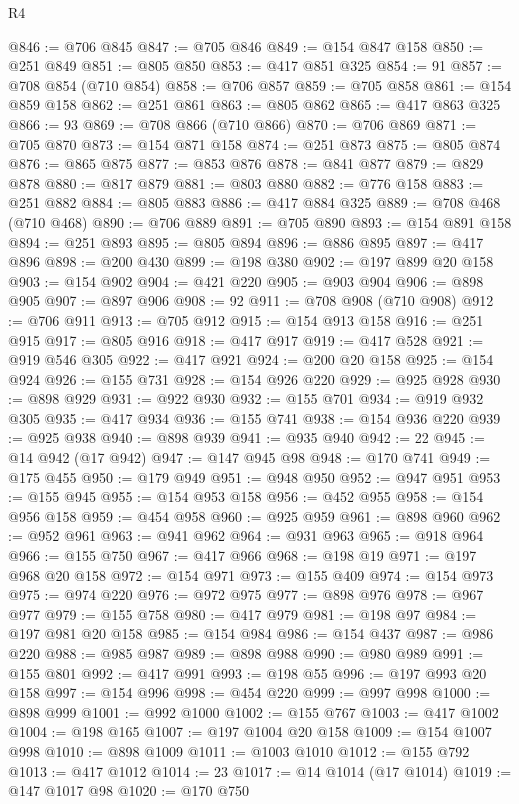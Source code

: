 \begin{lexlean}{R4}
\begin{coremodule}
@846 := @706 @845
@847 := @705 @846
@849 := @154 @847 @158
@850 := @251 @849
@851 := @805 @850
@853 := @417 @851 @325
@854 := 91
@857 := @708 @854 (@710 @854)
@858 := @706 @857
@859 := @705 @858
@861 := @154 @859 @158
@862 := @251 @861
@863 := @805 @862
@865 := @417 @863 @325
@866 := 93
@869 := @708 @866 (@710 @866)
@870 := @706 @869
@871 := @705 @870
@873 := @154 @871 @158
@874 := @251 @873
@875 := @805 @874
@876 := @865 @875
@877 := @853 @876
@878 := @841 @877
@879 := @829 @878
@880 := @817 @879
@881 := @803 @880
@882 := @776 @158
@883 := @251 @882
@884 := @805 @883
@886 := @417 @884 @325
@889 := @708 @468 (@710 @468)
@890 := @706 @889
@891 := @705 @890
@893 := @154 @891 @158
@894 := @251 @893
@895 := @805 @894
@896 := @886 @895
@897 := @417 @896
@898 := @200 @430
@899 := @198 @380
@902 := @197 @899 @20 @158
@903 := @154 @902
@904 := @421 @220
@905 := @903 @904
@906 := @898 @905
@907 := @897 @906
@908 := 92
@911 := @708 @908 (@710 @908)
@912 := @706 @911
@913 := @705 @912
@915 := @154 @913 @158
@916 := @251 @915
@917 := @805 @916
@918 := @417 @917
@919 := @417 @528
@921 := @919 @546 @305
@922 := @417 @921
@924 := @200 @20 @158
@925 := @154 @924
@926 := @155 @731
@928 := @154 @926 @220
@929 := @925 @928
@930 := @898 @929
@931 := @922 @930
@932 := @155 @701
@934 := @919 @932 @305
@935 := @417 @934
@936 := @155 @741
@938 := @154 @936 @220
@939 := @925 @938
@940 := @898 @939
@941 := @935 @940
@942 := 22
@945 := @14 @942 (@17 @942)
@947 := @147 @945 @98
@948 := @170 @741
@949 := @175 @455
@950 := @179 @949
@951 := @948 @950
@952 := @947 @951
@953 := @155 @945
@955 := @154 @953 @158
@956 := @452 @955
@958 := @154 @956 @158
@959 := @454 @958
@960 := @925 @959
@961 := @898 @960
@962 := @952 @961
@963 := @941 @962
@964 := @931 @963
@965 := @918 @964
@966 := @155 @750
@967 := @417 @966
@968 := @198 @19
@971 := @197 @968 @20 @158
@972 := @154 @971
@973 := @155 @409
@974 := @154 @973
@975 := @974 @220
@976 := @972 @975
@977 := @898 @976
@978 := @967 @977
@979 := @155 @758
@980 := @417 @979
@981 := @198 @97
@984 := @197 @981 @20 @158
@985 := @154 @984
@986 := @154 @437
@987 := @986 @220
@988 := @985 @987
@989 := @898 @988
@990 := @980 @989
@991 := @155 @801
@992 := @417 @991
@993 := @198 @55
@996 := @197 @993 @20 @158
@997 := @154 @996
@998 := @454 @220
@999 := @997 @998
@1000 := @898 @999
@1001 := @992 @1000
@1002 := @155 @767
@1003 := @417 @1002
@1004 := @198 @165
@1007 := @197 @1004 @20 @158
@1009 := @154 @1007 @998
@1010 := @898 @1009
@1011 := @1003 @1010
@1012 := @155 @792
@1013 := @417 @1012
@1014 := 23
@1017 := @14 @1014 (@17 @1014)
@1019 := @147 @1017 @98
@1020 := @170 @750

\end{coremodule}
\end{lexlean}
